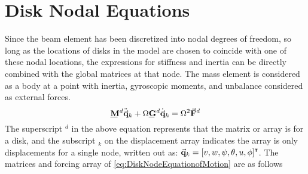 \section{Disk Nodal Equations} \label{Disk Nodal Equations}
Since the beam element has been discretized into nodal degrees of freedom, so long as the locations of disks in the model are chosen to coincide with one of these nodal locations, the expressions for stiffness and inertia can be directly combined with the global matrices at that node. The mass element is considered as a body at a point with inertia, gyroscopic moments, and unbalance considered as external forces.
\begin{equation}\label{eq:DiskNodeEquationofMotion}
\bunderline{\mathbf{M}}^d\ddot{\vec{\mathbf{q}}}_k+\Omega\bunderline{\mathbf{G}}^d\dot{\vec{\mathbf{q}}}_k=\Omega^2\vec{\mathbf{F}}^d
\end{equation}
The superscript $ ^d $ in the above equation represents that the matrix or array is for a disk, and the subscript $ _k $ on the displacement array indicates the array is only displacements for a single node, written out as: $ \vec{\mathbf{q}}_k = [v,w,\psi,\theta,u,\phi]^{\textbf{{\tiny \textsf{T}}}} $. The matrices and forcing array of \eqref{eq:DiskNodeEquationofMotion} are as follows
